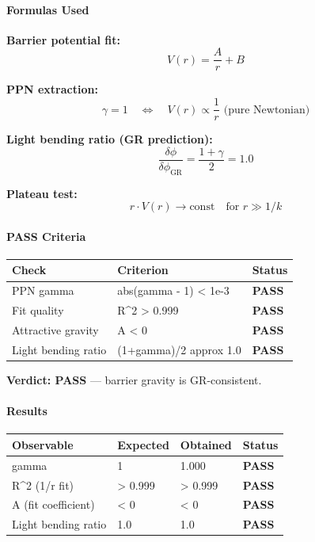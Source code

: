 \documentclass[
  11pt,
]{article}
\begin{document}
\bigskip

\hypertarget{formulas-used-6}{%
\paragraph{Formulas Used}\label{formulas-used-6}}

\textbf{Barrier potential fit:} \[V(r) = \frac{A}{r} + B \tag{132}\]

\textbf{PPN extraction:}
\[\gamma = 1 \quad \Leftrightarrow \quad V(r) \propto \frac{1}{r} \text{ (pure Newtonian)} \tag{133}\]

\textbf{Light bending ratio (GR prediction):}
\[\frac{\delta\phi}{\delta\phi_{\text{GR}}} = \frac{1+\gamma}{2} = 1.0 \tag{134}\]

\textbf{Plateau test:}
\[r \cdot V(r) \to \text{const} \quad \text{for } r \gg 1/k \tag{135}\]

\bigskip

\hypertarget{pass-criteria-6}{%
\paragraph{PASS Criteria}\label{pass-criteria-6}}

\begin{longtable}[]{@{}lll@{}}
\toprule
Check & Criterion & Status\tabularnewline
\midrule
\endhead
PPN gamma & abs(gamma - 1) \textless{} 1e-3 &
\textbf{PASS}\tabularnewline
Fit quality & R\^{}2 \textgreater{} 0.999 & \textbf{PASS}\tabularnewline
Attractive gravity & A \textless{} 0 & \textbf{PASS}\tabularnewline
Light bending ratio & (1+gamma)/2 approx 1.0 &
\textbf{PASS}\tabularnewline
\bottomrule
\end{longtable}

\textbf{Verdict: PASS} --- barrier gravity is GR-consistent.

\bigskip

\hypertarget{results-6}{%
\paragraph{Results}\label{results-6}}

\begin{longtable}[]{@{}llll@{}}
\toprule
Observable & Expected & Obtained & Status\tabularnewline
\midrule
\endhead
gamma & 1 & 1.000 & \textbf{PASS}\tabularnewline
R\^{}2 (1/r fit) & \textgreater{} 0.999 & \textgreater{} 0.999 &
\textbf{PASS}\tabularnewline
A (fit coefficient) & \textless{} 0 & \textless{} 0 &
\textbf{PASS}\tabularnewline
Light bending ratio & 1.0 & 1.0 & \textbf{PASS}\tabularnewline
\bottomrule
\end{longtable}
\end{document}
